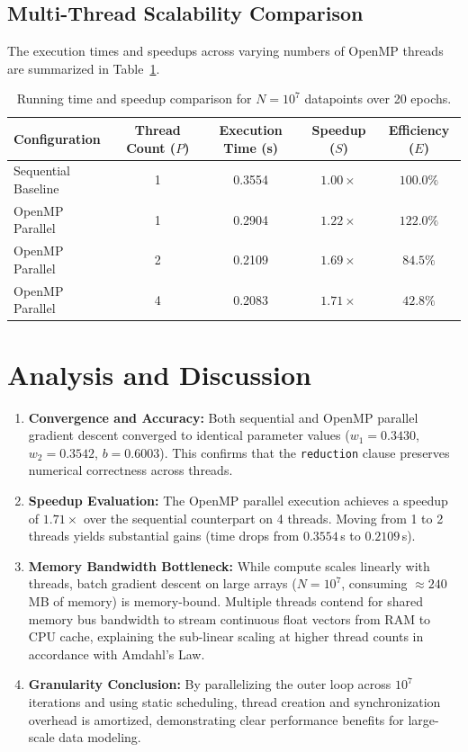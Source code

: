 \documentclass[12pt]{article}
\begin{document}
\subsection{Multi-Thread Scalability Comparison}
The execution times and speedups across varying numbers of OpenMP threads are summarized in Table~\ref{tab:results}.

\begin{table}[H]
\centering
\begin{tabular}{lcccc}
\toprule
\textbf{Configuration} & \textbf{Thread Count ($P$)} & \textbf{Execution Time (s)} & \textbf{Speedup ($S$)} & \textbf{Efficiency ($E$)} \\
\midrule
Sequential Baseline    & 1 & 0.3554 & $1.00\times$ & $100.0\%$ \\
OpenMP Parallel        & 1 & 0.2904 & $1.22\times$ & $122.0\%$ \\
OpenMP Parallel        & 2 & 0.2109 & $1.69\times$ & $84.5\%$  \\
OpenMP Parallel        & 4 & 0.2083 & $1.71\times$ & $42.8\%$  \\
\bottomrule
\end{tabular}
\caption{Running time and speedup comparison for $N = 10^7$ datapoints over 20 epochs.}
\label{tab:results}
\end{table}

\section{Analysis and Discussion}
\begin{enumerate}
    \item \textbf{Convergence and Accuracy:} Both sequential and OpenMP parallel gradient descent converged to identical parameter values ($w_1 = 0.3430$, $w_2 = 0.3542$, $b = 0.6003$). This confirms that the \texttt{reduction} clause preserves numerical correctness across threads.
    \item \textbf{Speedup Evaluation:} The OpenMP parallel execution achieves a speedup of $1.71\times$ over the sequential counterpart on 4 threads. Moving from 1 to 2 threads yields substantial gains (time drops from $0.3554$\,s to $0.2109$\,s).
    \item \textbf{Memory Bandwidth Bottleneck:} While compute scales linearly with threads, batch gradient descent on large arrays ($N = 10^7$, consuming $\approx 240$\,MB of memory) is memory-bound. Multiple threads contend for shared memory bus bandwidth to stream continuous float vectors from RAM to CPU cache, explaining the sub-linear scaling at higher thread counts in accordance with Amdahl's Law.
    \item \textbf{Granularity Conclusion:} By parallelizing the outer loop across $10^7$ iterations and using static scheduling, thread creation and synchronization overhead is amortized, demonstrating clear performance benefits for large-scale data modeling.
\end{enumerate}
\end{document}
